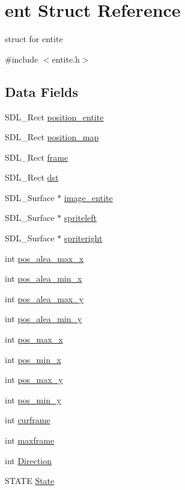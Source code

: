 \hypertarget{structent}{}\section{ent Struct Reference}
\label{structent}


struct for entite  




{\ttfamily \#include $<$entite.\+h$>$}

\subsection*{Data Fields}
\begin{DoxyCompactItemize}
\item 
S\+D\+L\+\_\+\+Rect \hyperlink{structent_a6a1d1ef8616b14a98ae9532cfb8c33e9}{position\+\_\+entite}
\item 
S\+D\+L\+\_\+\+Rect \hyperlink{structent_afea8f34bcada346f59d98f2fa13c64b8}{position\+\_\+map}
\item 
S\+D\+L\+\_\+\+Rect \hyperlink{structent_a5bf4e30b987726ecd55f0a0e25cd1471}{frame}
\item 
S\+D\+L\+\_\+\+Rect \hyperlink{structent_af824974d0d70a512f326c71208aa4474}{dst}
\item 
S\+D\+L\+\_\+\+Surface $\ast$ \hyperlink{structent_ada71906c5deb56a359f4a1c87a806e71}{image\+\_\+entite}
\item 
S\+D\+L\+\_\+\+Surface $\ast$ \hyperlink{structent_a7d33febca51de6fcf732a69aaf3b7fed}{spriteleft}
\item 
S\+D\+L\+\_\+\+Surface $\ast$ \hyperlink{structent_a8e2ca44dcbfe4e2f948a2b45cfa3724f}{spriteright}
\item 
int \hyperlink{structent_a78fb82b5fdb55f6d4a3f432049709419}{pos\+\_\+alea\+\_\+max\+\_\+x}
\item 
int \hyperlink{structent_a8d7999125392ec219b66bc78f2a41e14}{pos\+\_\+alea\+\_\+min\+\_\+x}
\item 
int \hyperlink{structent_ac0017841b85c5c162dbf49b69c2af772}{pos\+\_\+alea\+\_\+max\+\_\+y}
\item 
int \hyperlink{structent_aef1b031dc8b230ae3a0758026a6d38ac}{pos\+\_\+alea\+\_\+min\+\_\+y}
\item 
int \hyperlink{structent_a5b94401696ef3efa501b6c385002c9ec}{pos\+\_\+max\+\_\+x}
\item 
int \hyperlink{structent_a09b9e9e59a320783defabfc9b2b13472}{pos\+\_\+min\+\_\+x}
\item 
int \hyperlink{structent_a7484c8e1151a8213da135da607777b70}{pos\+\_\+max\+\_\+y}
\item 
int \hyperlink{structent_a732ef8e99756713622fb859d06c2ba9d}{pos\+\_\+min\+\_\+y}
\item 
int \hyperlink{structent_a939e5fe13dc8d4682ddbc87ddc8e45ad}{curframe}
\item 
int \hyperlink{structent_a9194acb09e81082e587403df320596ca}{maxframe}
\item 
int \hyperlink{structent_adf590d5e8b601da7bee63b67489e522a}{Direction}
\item 
S\+T\+A\+TE \hyperlink{structent_a430bce59586932a67536661d020a1347}{State}
\end{DoxyCompactItemize}


